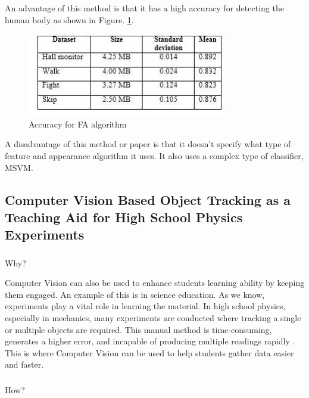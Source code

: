 \documentclass[conference]{IEEEtran}
\begin{document}
An advantage of this method is that it has a high accuracy for detecting the human body as shown in Figure. \ref{FA}.

\begin{figure}[htbp]
\includegraphics[width=\columnwidth]{Test1.JPG}
\caption{Accuracy for FA algorithm}
\label{FA}
\end{figure}


A disadvantage of this method or paper is that it doesn’t specify what type of feature and appearance algorithm it uses. It also uses a complex type of classifier, MSVM.


\subsection{Computer Vision Based Object Tracking as a Teaching Aid for High School Physics Experiments}

\subsubsection{}Why?

Computer Vision can also be used to enhance students learning ability by keeping them engaged. An example of this is in science education. As we know, experiments play a vital role in learning the material. In high school physics, especially in mechanics, many experiments are conducted where tracking a single or multiple objects are required. This manual method is time-consuming, generates a higher error, and incapable of producing multiple readings rapidly \cite{10}. This is where Computer Vision can be used to help students gather data easier and faster.

\subsubsection{}How? 
\end{document}
